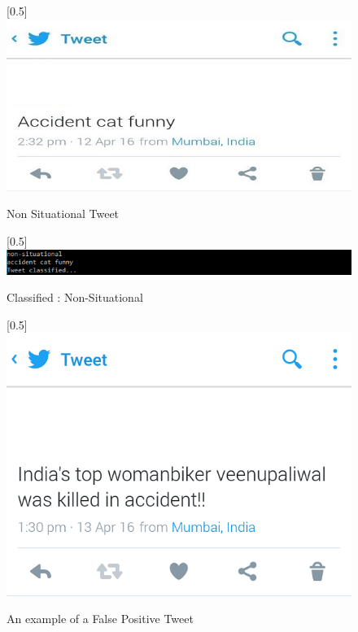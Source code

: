\documentclass[journal]{IEEEtran}
\begin{document}
\begin{center}
	\begin{figure}[H]
		\scalebox{0.5}[0.5]{\includegraphics{NonSituationalTweet}}
		\caption{Non Situational Tweet}
		\label{NonSituationalTweet}
	\end{figure}
\end{center}
\begin{center}
	\begin{figure}[H]
		\scalebox{0.5}[0.5]{\includegraphics{NonSituational}}
		\caption{Classified : Non-Situational}
		\label{ClassifiedNonSituational}
	\end{figure}
\end{center}
\begin{center}
	\begin{figure}[H]
		\scalebox{0.5}[0.5]{\includegraphics{FalsePositiveTweet}}
		\caption{An example of a False Positive Tweet}
		\label{FalsePositiveTweet}
	\end{figure}
\end{center}
\end{document}
